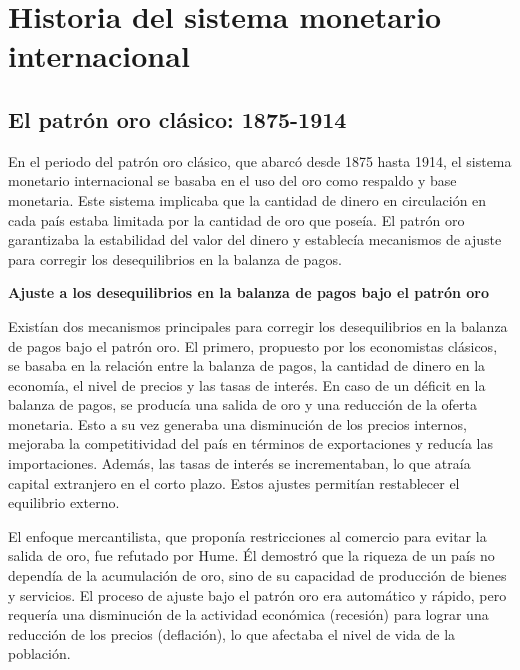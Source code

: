 \documentclass[
  a4paper,
]{article}
\begin{document}
\hypertarget{historia-del-sistema-monetario-internacional}{%
\section{Historia del sistema monetario
internacional}\label{historia-del-sistema-monetario-internacional}}

\hypertarget{el-patruxf3n-oro-cluxe1sico-1875-1914}{%
\subsection{El patrón oro clásico:
1875-1914}\label{el-patruxf3n-oro-cluxe1sico-1875-1914}}

En el periodo del patrón oro clásico, que abarcó desde 1875 hasta 1914,
el sistema monetario internacional se basaba en el uso del oro como
respaldo y base monetaria. Este sistema implicaba que la cantidad de
dinero en circulación en cada país estaba limitada por la cantidad de
oro que poseía. El patrón oro garantizaba la estabilidad del valor del
dinero y establecía mecanismos de ajuste para corregir los
desequilibrios en la balanza de pagos.

\textbf{Ajuste a los desequilibrios en la balanza de pagos bajo el
patrón oro}

Existían dos mecanismos principales para corregir los desequilibrios en
la balanza de pagos bajo el patrón oro. El primero, propuesto por los
economistas clásicos, se basaba en la relación entre la balanza de
pagos, la cantidad de dinero en la economía, el nivel de precios y las
tasas de interés. En caso de un déficit en la balanza de pagos, se
producía una salida de oro y una reducción de la oferta monetaria. Esto
a su vez generaba una disminución de los precios internos, mejoraba la
competitividad del país en términos de exportaciones y reducía las
importaciones. Además, las tasas de interés se incrementaban, lo que
atraía capital extranjero en el corto plazo. Estos ajustes permitían
restablecer el equilibrio externo.

El enfoque mercantilista, que proponía restricciones al comercio para
evitar la salida de oro, fue refutado por Hume. Él demostró que la
riqueza de un país no dependía de la acumulación de oro, sino de su
capacidad de producción de bienes y servicios. El proceso de ajuste bajo
el patrón oro era automático y rápido, pero requería una disminución de
la actividad económica (recesión) para lograr una reducción de los
precios (deflación), lo que afectaba el nivel de vida de la población.
\end{document}
